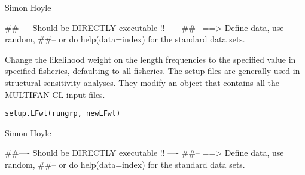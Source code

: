 \documentclass[a4paper]{book}
\begin{document}
%
\begin{Author}\relax

Simon Hoyle
\end{Author}
%
\begin{Examples}
\begin{ExampleCode}
##---- Should be DIRECTLY executable !! ----
##-- ==>  Define data, use random,
##--	or do  help(data=index)  for the standard data sets.

\end{ExampleCode}
\end{Examples}
%
\begin{Description}\relax

Change the likelihood weight on the length frequencies to the specified value in specified fisheries, defaulting to all fisheries. 
The setup files are generally used in structural sensitivity analyses. They modify an object that contains all the MULTIFAN-CL input files. 
\end{Description}
%
\begin{Usage}
\begin{verbatim}
setup.LFwt(rungrp, newLFwt)
\end{verbatim}
\end{Usage}
%
\begin{Arguments}
\begin{ldescription}
\item[\code{rungrp}] 


\item[\code{newLFwt}] 


\end{ldescription}
\end{Arguments}
%
\begin{Author}\relax

Simon Hoyle
\end{Author}
%
\begin{Examples}
\begin{ExampleCode}
##---- Should be DIRECTLY executable !! ----
##-- ==>  Define data, use random,
##--	or do  help(data=index)  for the standard data sets.

\end{ExampleCode}
\end{Examples}
\end{document}
